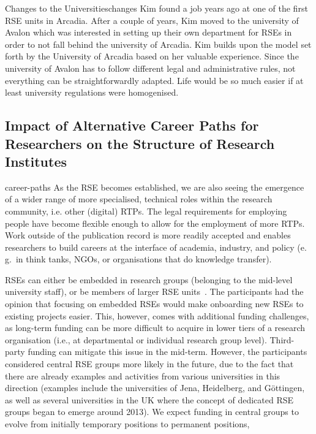 \documentclass{eceasst}
\newcommand{\eg}{e.\,g.}
\begin{document}
\begin{story}{Changes to the Universities}{changes}
Kim found a job years ago at one of the first RSE units in Arcadia. After a couple of years, Kim moved to the university of
Avalon which was interested in setting up their own department for RSEs in order to not fall behind the university of Arcadia.
Kim builds upon the model set forth by the University of Arcadia based on her valuable experience. Since the university
of Avalon has to follow different legal and administrative rules, not everything can be straightforwardly adapted.
Life would be so much easier if at least university regulations were homogenised.
\end{story}

\subsection{Impact of Alternative Career Paths for Researchers on the Structure of Research Institutes}
\begin{whatis}{}{career-paths}
As the RSE becomes established, we are also seeing the emergence of a wider range of more specialised, technical roles within the research community, i.e. other (digital) RTPs.
The legal requirements for employing people have become flexible enough to allow for the employment of more RTPs.
Work outside of the publication record is more readily accepted and enables researchers to build careers at the interface of academia, industry, and policy
(\eg\ in think tanks, NGOs, or organisations that do knowledge transfer).
\end{whatis}
RSEs can either be embedded in research groups (belonging to the mid-level university staff),
or be members of larger RSE units~\cite{Kempf2025-draft}.
The participants had the opinion that focusing on embedded RSEs would make onboarding new RSEs to existing projects easier.
This, however, comes with additional funding challenges,
as long-term funding can be more difficult to acquire in lower tiers of a research organisation (i.e., at departmental or individual research group level).
Third-party funding can mitigate this issue in the mid-term.
However, the participants considered central RSE groups more likely in the future,
due to the fact that there are already examples and activities from various universities in this direction
(examples include the universities of Jena, Heidelberg, and Göttingen, as well as several universities
in the UK where the concept of dedicated RSE groups began to emerge around 2013).
We expect funding in central groups to evolve from initially temporary positions to permanent positions,
\end{document}
